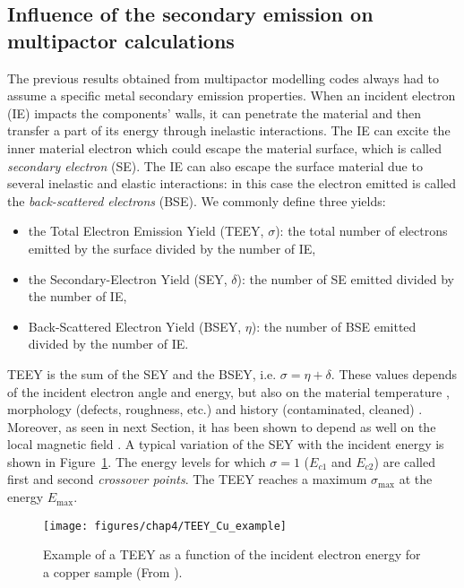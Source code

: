 \subsection[Influence of Electron Emission]{Influence of the secondary emission on multipactor calculations}\label{sec:multipactor_TEEY}
The previous results obtained from multipactor modelling codes always had to assume a specific metal secondary emission properties. When an incident electron (IE) impacts the components' walls, it can penetrate the material and then transfer a part of its energy through inelastic interactions. The IE can excite the inner material electron which could escape the material surface, which is called \textit{secondary electron} (SE). The IE can also escape the surface material due to several inelastic and elastic interactions: in this case the electron emitted is called the \textit{back-scattered electrons} (BSE). We commonly define three yields: 
\begin{itemize}
	\item the Total Electron Emission Yield (TEEY, $\sigma$): the total number of electrons emitted by the surface divided by the number of IE,
	\item the Secondary-Electron Yield (SEY, $\delta$): the number of SE emitted divided by the number of IE,
	\item Back-Scattered Electron Yield (BSEY, $\eta$): the	number of BSE emitted divided by the number of IE. 
\end{itemize}
TEEY is the sum of the SEY and the BSEY, i.e. $\sigma=\eta+\delta$. These values depends of the incident electron angle and energy, but also on the material temperature , morphology (defects, roughness, etc.)  and history (contaminated, cleaned) . Moreover, as seen in next Section, it has been shown to depend as well on the local magnetic field . A  typical variation of the SEY with the incident energy is shown in Figure~\ref{fig:teeycuexample}. The energy levels for which $\sigma=1$ ($E_{c1}$ and $E_{c2}$) are called first and second \textit{crossover points}. The TEEY reaches a maximum $\sigma_{\max}$ at the energy $E_{\max}$. 

\begin{figure}[h]
	\centering
	\texttt{[image: figures/chap4/TEEY\_Cu\_example]}
	\caption{Example of a TEEY as a function of the incident electron energy for a copper sample (From ).}
	\label{fig:teeycuexample}
\end{figure}

